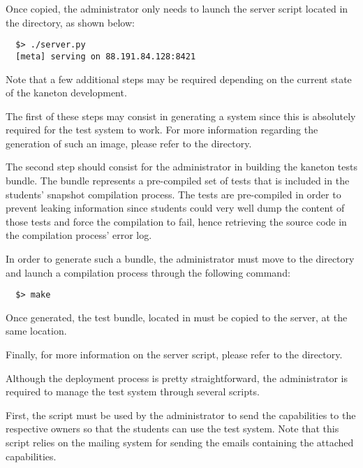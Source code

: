 Once copied, the administrator only needs to launch the server script located
in the  directory, as shown below:

\begin{verbatim}
  $> ./server.py
  [meta] serving on 88.191.84.128:8421
\end{verbatim}

Note that a few additional steps may be required depending on the current state
of the kaneton development.

The first of these steps may consist in generating a  system
since this is absolutely required for the test system to work. For more
information regarding the generation of such an image, please refer to the
 directory.

The second step should consist for the administrator in building the kaneton
tests bundle. The bundle represents a pre-compiled set of tests that is
included in the students' snapshot compilation process. The tests are
pre-compiled in order to prevent leaking information since students could
very well dump the content of those tests and force the compilation to fail,
hence retrieving the source code in the compilation process' error log.

In order to generate such a bundle, the administrator must move to the
 directory and launch a compilation process through
the following command:

\begin{verbatim}
  $> make
\end{verbatim}

Once generated, the test bundle, located in 
must be copied to the server, at the same location.

Finally, for more information on the server script, please refer to the
 directory.


Although the deployment process is pretty straightforward, the administrator
is required to manage the test system through several scripts.

First, the  script must be used by the administrator to send
the capabilities to the respective owners so that the students can use
the test system. Note that this script relies on the  mailing
system for sending the emails containing the attached capabilities.

